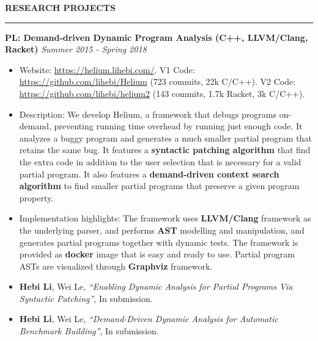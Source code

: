 \documentclass[10pt,letterpaper]{article}
\newenvironment{mysection}[1]{ %
  \medskip
  \MakeUppercase{\bf #1}
  \medskip
  \hrule
  \medskip
  \begin{list}{}{
      \setlength{\leftmargin}{1.5em}
    }
  \item[]
}{
  \end{list}
}
\begin{document}
\begin{mysection}{Research Projects}
  \textbf{PL: Demand-driven Dynamic Program Analysis (C++,
    LLVM/Clang, Racket)} \hfill \emph{Summer 2015 - Spring 2018}

  \begin{itemize}
  \item Website: \url{https://helium.lihebi.com/}. V1 Code:
    \url{https://github.com/lihebi/Helium} (723 commits, 22k
    C/C++). V2 Code: \url{https://github.com/lihebi/helium2} (143
    commits, 1.7k Racket, 3k C/C++).
  \item Description: We develop Helium, a framework that debugs
    programs on-demand, preventing running time overhead by running
    just enough code. It analyzes a buggy program and generates a much
    smaller partial program that retains the same bug.  It features a
    \textbf{syntactic patching algorithm} that find the extra code in
    addition to the user selection that is necessary for a valid
    partial program. It also features a \textbf{demand-driven context
      search algorithm} to find smaller partial programs that preserve
    a given program property.
  \item Implementation highlights: The framework uses
    \textbf{LLVM/Clang} framework as the underlying parser, and
    performs \textbf{AST} modelling and manipulation, and generates
    partial programs together with dynamic tests. The framework is
    provided as \textbf{docker} image that is easy and ready to
    use. Partial program ASTs are visualized through \textbf{Graphviz}
    framework.
  \item \textbf{Hebi Li}, Wei Le, \textit{``Enabling Dynamic Analysis
    for Partial Programs Via Syntactic Patching''}, In submission.
  \item \textbf{Hebi Li}, Wei Le, \textit{``Demand-Driven Dynamic
    Analysis for Automatic Benchmark Building''}, In submission.
  \end{itemize}


\end{mysection}

\end{document}
